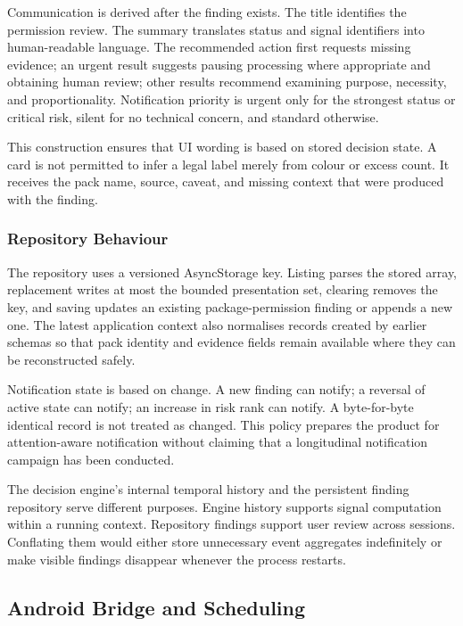Communication is derived after the finding exists. The title identifies the permission review. The summary translates status and signal identifiers into human-readable language. The recommended action first requests missing evidence; an urgent result suggests pausing processing where appropriate and obtaining human review; other results recommend examining purpose, necessity, and proportionality. Notification priority is urgent only for the strongest status or critical risk, silent for no technical concern, and standard otherwise.

This construction ensures that UI wording is based on stored decision state. A card is not permitted to infer a legal label merely from colour or excess count. It receives the pack name, source, caveat, and missing context that were produced with the finding.

\subsubsection{Repository Behaviour}

The repository uses a versioned AsyncStorage key. Listing parses the stored array, replacement writes at most the bounded presentation set, clearing removes the key, and saving updates an existing package-permission finding or appends a new one. The latest application context also normalises records created by earlier schemas so that pack identity and evidence fields remain available where they can be reconstructed safely.

Notification state is based on change. A new finding can notify; a reversal of active state can notify; an increase in risk rank can notify. A byte-for-byte identical record is not treated as changed. This policy prepares the product for attention-aware notification without claiming that a longitudinal notification campaign has been conducted.

The decision engine's internal temporal history and the persistent finding repository serve different purposes. Engine history supports signal computation within a running context. Repository findings support user review across sessions. Conflating them would either store unnecessary event aggregates indefinitely or make visible findings disappear whenever the process restarts.

\subsection{Android Bridge and Scheduling}

